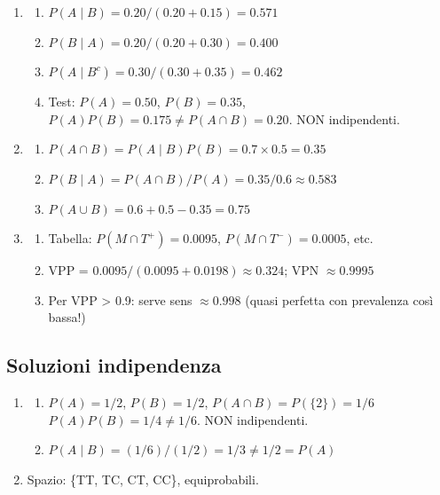 \documentclass[
  letterpaper,
  DIV=11,
  numbers=noendperiod,
  oneside]{scrreprt}
\providecommand{\tightlist}{%
  \setlength{\itemsep}{0pt}\setlength{\parskip}{0pt}}
\theoremstyle{definition}
\theoremstyle{plain}
\theoremstyle{definition}
\theoremstyle{remark}
\begin{document}
\begin{tcolorbox}
\begin{enumerate}
\def\labelenumi{\arabic{enumi}.}
\setcounter{enumi}{5}
\tightlist
\item
  \begin{enumerate}
  \def\labelenumii{\alph{enumii}.}
  \tightlist
  \item
    \(P(A \mid B) = 0.20 / (0.20 + 0.15) = 0.571\)
  \item
    \(P(B \mid A) = 0.20 / (0.20 + 0.30) = 0.400\)
  \item
    \(P(A \mid B^c) = 0.30 / (0.30 + 0.35) = 0.462\)
  \item
    Test: \(P(A) = 0.50\), \(P(B) = 0.35\),
    \(P(A) P(B) = 0.175 \neq P(A \cap B) = 0.20\). NON indipendenti.
  \end{enumerate}
\item
  \begin{enumerate}
  \def\labelenumii{\alph{enumii}.}
  \tightlist
  \item
    \(P(A \cap B) = P(A \mid B) P(B) = 0.7 \times 0.5 = 0.35\)
  \item
    \(P(B \mid A) = P(A \cap B) / P(A) = 0.35 / 0.6 \approx 0.583\)
  \item
    \(P(A \cup B) = 0.6 + 0.5 - 0.35 = 0.75\)
  \end{enumerate}
\item
  \begin{enumerate}
  \def\labelenumii{\alph{enumii}.}
  \tightlist
  \item
    Tabella: \(P(M \cap T^+) = 0.0095\), \(P(M \cap T^-) = 0.0005\),
    etc.
  \item
    VPP = \(0.0095 / (0.0095 + 0.0198) \approx 0.324\); VPN
    \(\approx 0.9995\)
  \item
    Per VPP \textgreater{} 0.9: serve sens \(\approx 0.998\) (quasi
    perfetta con prevalenza così bassa!)
  \end{enumerate}
\end{enumerate}

\subsection{Soluzioni indipendenza}\label{soluzioni-indipendenza}

\begin{enumerate}
\def\labelenumi{\arabic{enumi}.}
\setcounter{enumi}{8}
\tightlist
\item
  \begin{enumerate}
  \def\labelenumii{\alph{enumii}.}
  \tightlist
  \item
    \(P(A) = 1/2\), \(P(B) = 1/2\), \(P(A \cap B) = P(\{2\}) = 1/6\)
    \(P(A) P(B) = 1/4 \neq 1/6\). NON indipendenti.
  \item
    \(P(A \mid B) = (1/6) / (1/2) = 1/3 \neq 1/2 = P(A)\)
  \end{enumerate}
\item
  Spazio: \{TT, TC, CT, CC\}, equiprobabili.


\end{enumerate}
\end{tcolorbox}
\end{document}
